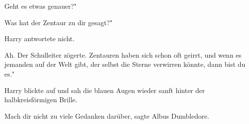 \glqq{}Geht es etwas genauer?"

\glqq{}Was hat der Zentaur zu dir gesagt?"

Harry antwortete nicht.

\glqq{}Ah.\grqq{} Der Schulleiter zögerte. \glqq{}Zentauren haben sich schon oft
geirrt, und wenn es jemanden auf der Welt gibt, der selbst die Sterne verwirren
könnte, dann bist du es."

Harry blickte auf und sah die blauen Augen wieder sanft hinter der
halbkreisförmigen Brille.

\glqq{}Mach dir nicht zu viele Gedanken darüber\grqq{}, sagte Albus Dumbledore.


